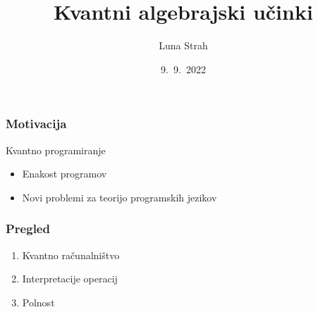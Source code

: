 \documentclass[slovene]{beamer}
\title{Kvantni algebrajski učinki}
\author{Luna Strah}
\institute{mentor: doc. dr. Matija Pretnar}
\date{9.~9.~2022}
\begin{document}
\frame{\titlepage}

\begin{frame}
    \frametitle{Motivacija}

    \pause
    Kvantno programiranje
    \begin{itemize}
        \item Enakost programov
        \pause
        \item Novi problemi za teorijo programskih jezikov
    \end{itemize}

\end{frame}
\begin{frame}
    \frametitle{Pregled}

    \begin{enumerate}
        \item Kvantno računalništvo
        \item Interpretacije operacij
        \item Polnost
    \end{enumerate}
\end{frame}
\end{document}
